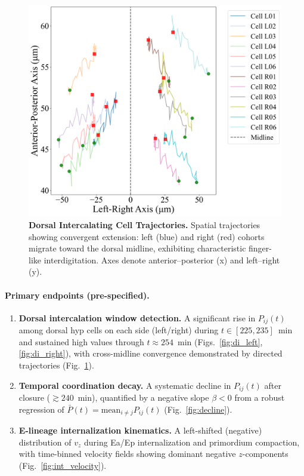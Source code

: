 \documentclass[unnumsec,webpdf,modern,large,namedate]{oup-authoring-template}%
\theoremstyle{thmstyleone}\newtheorem{theorem}{Theorem}
\theoremstyle{thmstyletwo}\newtheorem{example}{Example}
\theoremstyle{thmstylethree}\newtheorem{definition}{Definition}
\begin{document}
\begin{figure}[t]
  \centering
  \includegraphics[width=\linewidth]{Demo2_Dorsal_Cell_Trajectories.png}
  \caption{\textbf{Dorsal Intercalating Cell Trajectories.} Spatial trajectories showing convergent extension: left (blue) and right (red) cohorts migrate toward the dorsal midline, exhibiting characteristic finger-like interdigitation. Axes denote anterior--posterior (x) and left--right (y).}
  \label{fig:di_tracks}
\end{figure}

\paragraph{Primary endpoints (pre-specified).}
\begin{enumerate}
\item \textbf{Dorsal intercalation window detection.} A significant rise in $P_{ij}(t)$ among dorsal hyp cells on each side (left/right) during $t\in[225,235]$~min and sustained high values through $t\approx 254$~min (Figs.~\ref{fig:di_left},\ref{fig:di_right}), with cross-midline convergence demonstrated by directed trajectories (Fig.~\ref{fig:di_tracks}).
\item \textbf{Temporal coordination decay.} A systematic decline in $P_{ij}(t)$ after closure ($\gtrsim 240$~min), quantified by a negative slope $\beta<0$ from a robust regression of $\bar{P}(t)=\mathrm{mean}_{i\neq j}P_{ij}(t)$ (Fig.~\ref{fig:decline}).
\item \textbf{E-lineage internalization kinematics.} A left-shifted (negative) distribution of $v_z$ during Ea/Ep internalization and primordium compaction, with time-binned velocity fields showing dominant negative $z$-components (Fig.~\ref{fig:int_velocity}).
\end{enumerate}
\end{document}
